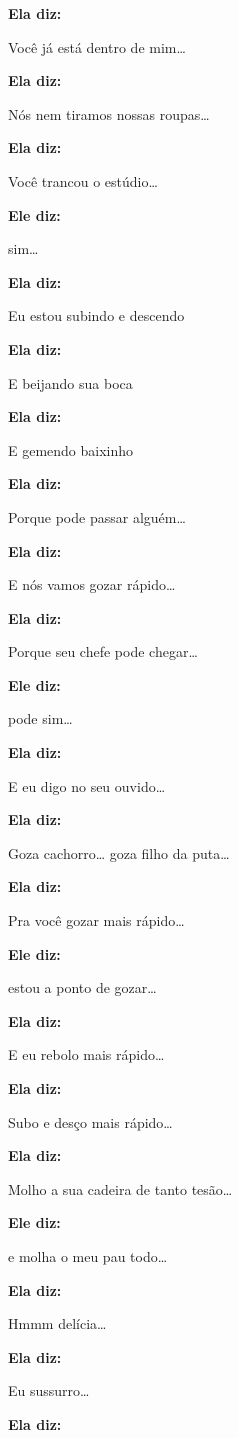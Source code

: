 \textbf{Ela diz:}

Você já está dentro de mim…

\textbf{Ela diz:}

Nós nem tiramos nossas roupas…

\textbf{Ela diz:}

Você trancou o estúdio…

\textbf{Ele diz:}

sim…

\textbf{Ela diz:}

Eu estou subindo e descendo

\textbf{Ela diz:}

E beijando sua boca

\textbf{Ela diz:}

E gemendo baixinho

\textbf{Ela diz:}

Porque pode passar alguém…

\textbf{Ela diz:}

E nós vamos gozar rápido…

\textbf{Ela diz:}

Porque seu chefe pode chegar…

\textbf{Ele diz:}

pode sim…

\textbf{Ela diz:}

E eu digo no seu ouvido…

\textbf{Ela diz:}

Goza cachorro… goza filho da puta…

\textbf{Ela diz:}

Pra você gozar mais rápido…

\textbf{Ele diz:}

estou a ponto de gozar…

\textbf{Ela diz:}

E eu rebolo mais rápido…

\textbf{Ela diz:}

Subo e desço mais rápido…

\textbf{Ela diz:}

Molho a sua cadeira de tanto tesão…

\textbf{Ele diz:}

e molha o meu pau todo…

\textbf{Ela diz:}

Hmmm delícia…

\textbf{Ela diz:}

Eu sussurro…

\textbf{Ela diz:}

